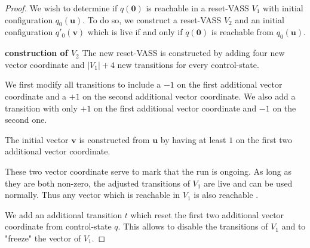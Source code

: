 \begin{proof}


We wish to determine if $q(\textbf{0})$ is reachable in a reset-VASS $V_1$
with
initial configuration $q_0(\textbf{u})$.
To do so, we construct a reset-VASS $V_2$
and an initial configuration $q'_0(\textbf{v})$ 
which is live if and only if 
$q(\textbf{0})$
is reachable from $q_0(\textbf{u})$.

{\bf construction of $V_2$}
The new reset-VASS is constructed by adding four new vector coordinate
and
$|V_1|+4$ new transitions for every control-state.

We first modify all transitions to include a $-1$ on the first additional vector coordinate and a $+1$ on the second additional vector coordinate. We also add a transition with only $+1$ on the first additional vector coordinate and $-1$ on the second one.



The initial vector $\textbf{v}$ is constructed from $\textbf{u}$ by having at least $1$ on the first two additional vector coordinate.


These two vector coordinate serve to mark that the run is ongoing. As long as they are both non-zero, the adjusted transitions of $V_1$ are live and can be used normally. Thus any vector which is reachable in $V_1$ is also reachable%
.



We add an additional transition $t$ %
which reset the first two additional vector coordinate from control-state $q$.
This allows to disable the transitions of $V_1$ and to "freeze" the vector of $V_1$.


\end{proof}
